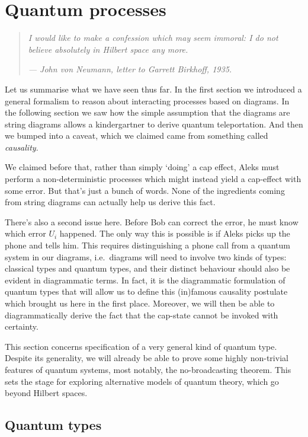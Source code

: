 \documentclass[12pt]{article}
\begin{document}
\section{Quantum processes}

\begin{quote}
\em I would like to make a confession which may seem immoral: I do not believe   
absolutely in Hilbert space any more.\par \em \hfill    --- John von Neumann, letter to Garrett Birkhoff, 1935.         
\end{quote}

\noindent
Let us summarise what we have seen thus far.  In the first section we introduced a general formalism to reason about interacting processes based on diagrams.  In the following section we saw how the simple assumption that the diagrams are string diagrams allows a kindergartner to derive quantum teleportation. And then we bumped into a caveat, which we claimed came from something called \textit{causality}.

We claimed before that, rather than simply `doing' a cap effect, Aleks must perform a non-deterministic processes which might instead yield a cap-effect with some error. But that's just a bunch of words. None of the ingredients coming from string diagrams can actually help us derive this fact.

There's also a second issue here. Before Bob can correct the error, he must know which error $U_i$ happened. The only way this is possible is if Aleks picks up the phone and tells him. This requires distinguishing a phone call from a quantum system in our diagrams, i.e.~diagrams will need to involve two kinds of types: classical types and quantum types, and their distinct behaviour should also be evident in diagrammatic terms. In fact, it is the diagrammatic  formulation of quantum types that will allow us to  define this (in)famous causality postulate  which brought us here in the first place. Moreover, we will then be able to diagrammatically derive the fact that the cap-state cannot be invoked with certainty.

This section concerns specification of a  very general kind of quantum type.  Despite its generality, we will already be able to prove some highly non-trivial features of quantum systems, most notably, the no-broadcasting theorem.  This sets the stage for exploring alternative models  of quantum theory, which go beyond Hilbert spaces.

\subsection{Quantum types}
\end{document}
